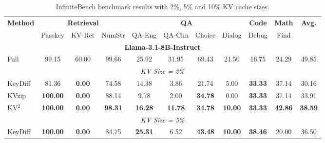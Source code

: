 \documentclass[11pt]{article}
\begin{document}
\pagestyle{empty}

\begin{table}[htbp]
\centering
\caption{InfiniteBench benchmark results with 2\%, 5\% and 10\% KV cache sizes.}
\label{tab:infinitebench_results}
\small
\setlength{\tabcolsep}{3pt}
\renewcommand{\arraystretch}{1.2}

\begin{tabular}{l|ccc|cccc|c|c|c}
\toprule
\multirow{2}{*}{\textbf{Method}} 
    & \multicolumn{3}{c|}{\textbf{Retrieval}}
    & \multicolumn{4}{c|}{\textbf{QA}} 
    & \textbf{Code}
    & \textbf{Math}
    & \multirow{2}{*}{\textbf{Avg.}} \\
\cmidrule(lr){2-4} \cmidrule(lr){5-8} \cmidrule(lr){9-9} \cmidrule(lr){10-10}
    & Passkey & KV-Ret & NumStr 
    & QA-Eng & QA-Chn & Choice & Dialog 
    & Debug
    & Find
    & \\
\midrule

\multicolumn{11}{c}{\textbf{Llama-3.1-8B-Instruct}} \\
\midrule

Full 
    & 99.15 & 60.00 & 99.66
    & 25.92 & 31.95 & 69.43 & 21.50
    & 16.75
    & 24.29
    & 49.85 \\

\midrule
\multicolumn{11}{c}{\textit{KV Size = 2\%}} \\
\midrule

KeyDiff 
    & 81.36 & \textbf{0.00} & 74.58
    & 14.38 & 3.86 & 21.74 & 5.00
    & \textbf{33.33}
    & 37.14
    & 30.16 \\

KVzip 
    & \textbf{100.00} & \textbf{0.00} & 88.14
    & 9.78 & 2.00 & \textbf{34.78} & 0.00
    & \textbf{33.33}
    & 37.14
    & 33.91 \\

KV$^2$
    & \textbf{100.00} & \textbf{0.00} & \textbf{98.31}
    & \textbf{16.28} & \textbf{11.78} & \textbf{34.78} & \textbf{10.00}
    & \textbf{33.33}
    & \textbf{42.86}
    & \textbf{38.59} \\

\midrule
\multicolumn{11}{c}{\textit{KV Size = 5\%}} \\
\midrule

KeyDiff 
    & \textbf{100.00} & \textbf{0.00} & 84.75
    & \textbf{25.31} & 6.52 & \textbf{43.48} & \textbf{10.00}
    & \textbf{38.46}
    & 20.00
    & 36.50 \\


\end{tabular}
\end{table}
\end{document}
